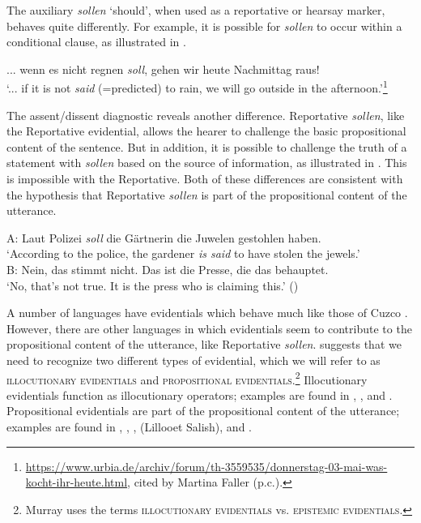 The  auxiliary \textit{sollen} ‘should’, when used as a reportative or hearsay marker, behaves quite differently. For example, it is possible for \textit{sollen} to occur within a conditional clause, as illustrated in .


\ea \label{ex:17.9}
... wenn es nicht regnen \textit{soll}, gehen wir heute Nachmittag raus!\\
‘... if it is not \textit{said} (=predicted) to rain, we will go outside in the afternoon.’\footnote{\url{https://www.urbia.de/archiv/forum/th-3559535/donnerstag-03-mai-was-kocht-ihr-heute.html}, cited by Martina Faller (p.c.).}\\
  
\z


The assent/dissent diagnostic reveals another difference.  Reportative \textit{sollen}, like the  Reportative evidential, allows the hearer to challenge the basic propositional content of the sentence. But in addition, it is possible to challenge the truth of a statement with \textit{sollen} based on the source of information, as illustrated in . This is impossible with the  Reportative. Both of these differences are consistent with the hypothesis that  Reportative \textit{sollen} is part of the propositional content of the utterance.


\ea \label{ex:17.10}
A: Laut Polizei \textit{soll} die Gärtnerin die Juwelen gestohlen haben.\\
\glt   ‘According to the police, the gardener \textit{is said} to have stolen the jewels.’\\
\bigskip
B: Nein, das stimmt nicht. Das ist die Presse, die das behauptet.\\
\glt    ‘No, that’s not true. It is the press who is claiming this.’  (\citealt{Faller2006})
\z


A number of languages have evidentials which behave much like those of Cuzco . However, there are other languages in which evidentials seem to contribute to the propositional content of the utterance, like  Reportative \textit{sollen}. \citet{Murray2010} suggests that we need to recognize two different types of evidential, which we will refer to as \textsc{illocutionary evidentials} and \textsc{propositional evidentials}.\footnote{Murray uses the terms \textsc{illocutionary evidentials} vs. \textsc{epistemic evidentials}.} Illocutionary evidentials function as illocutionary operators; examples are found in , , and . Propositional evidentials are part of the propositional content of the utterance; examples are found in , , ,  (Lillooet Salish), and .



